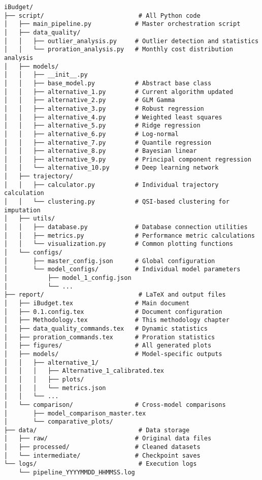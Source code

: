 \begin{verbatim}
iBudget/
├── script/                          # All Python code
│   ├── main_pipeline.py            # Master orchestration script
│   ├── data_quality/
│   │   ├── outlier_analysis.py     # Outlier detection and statistics
│   │   └── proration_analysis.py   # Monthly cost distribution analysis
│   ├── models/
│   │   ├── __init__.py
│   │   ├── base_model.py           # Abstract base class
│   │   ├── alternative_1.py        # Current algorithm updated
│   │   ├── alternative_2.py        # GLM Gamma
│   │   ├── alternative_3.py        # Robust regression
│   │   ├── alternative_4.py        # Weighted least squares
│   │   ├── alternative_5.py        # Ridge regression
│   │   ├── alternative_6.py        # Log-normal
│   │   ├── alternative_7.py        # Quantile regression
│   │   ├── alternative_8.py        # Bayesian linear
│   │   ├── alternative_9.py        # Principal component regression
│   │   └── alternative_10.py       # Deep learning network
│   ├── trajectory/
│   │   ├── calculator.py           # Individual trajectory calculation
│   │   └── clustering.py           # QSI-based clustering for imputation
│   ├── utils/
│   │   ├── database.py             # Database connection utilities
│   │   ├── metrics.py              # Performance metric calculations
│   │   └── visualization.py        # Common plotting functions
│   └── configs/
│       ├── master_config.json      # Global configuration
│       └── model_configs/          # Individual model parameters
│           ├── model_1_config.json
│           └── ...
├── report/                          # LaTeX and output files
│   ├── iBudget.tex                 # Main document
│   ├── 0.1.config.tex              # Document configuration
│   ├── Methodology.tex             # This methodology chapter
│   ├── data_quality_commands.tex   # Dynamic statistics
│   ├── proration_commands.tex      # Proration statistics
│   ├── figures/                    # All generated plots
│   ├── models/                     # Model-specific outputs
│   │   ├── alternative_1/
│   │   │   ├── Alternative_1_calibrated.tex
│   │   │   ├── plots/
│   │   │   └── metrics.json
│   │   └── ...
│   └── comparison/                 # Cross-model comparisons
│       ├── model_comparison_master.tex
│       └── comparative_plots/
├── data/                            # Data storage
│   ├── raw/                        # Original data files
│   ├── processed/                  # Cleaned datasets
│   └── intermediate/               # Checkpoint saves
└── logs/                            # Execution logs
    └── pipeline_YYYYMMDD_HHMMSS.log
\end{verbatim}

